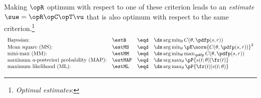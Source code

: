 Making $\opR$ optimum with respect to one of these criterion leads to
an {\em estimate} $\sue = \opR\opC\opT\vu$ that is also optimum
with respect to the same criterion.\footnote{
   {\em Optimal estimates}:
    
   }
\[
\begin{array}{llcl}
   \text{Bayesian:}                               & \estB   &\eqd& \ds \arg\min_{\theta} C(\theta,\pdfp(s,r)) \\
   \text{Mean square (MS):}                       & \estMS  &\eqd& \ds \arg\min_{\theta} \pE\norm{C(\theta,\pdfp(s,r))}^2 \\
   \text{mini-max (MM):}                          & \estMM  &\eqd& \ds \arg\min_{\theta}\max_{\pdfp} C(\theta,\pdfp(s,r)) \\
   \text{maximum a-posteriori probability (MAP):} & \estMAP &\eqd& \ds \arg\max_{\theta} \pP{s(t;\theta)|\fr(t)} \\
   \text{maximum likelihood (ML):}                & \estML  &\eqd& \ds \arg\max_{\theta} \pP{\fr(t)|s(t;\theta)} \\
\end{array}
\]

